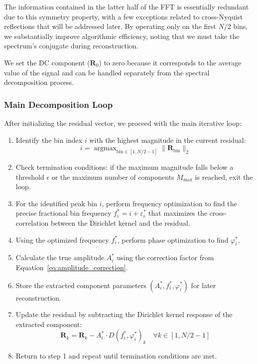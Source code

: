 \documentclass[11pt,twoside]{report}
\DeclareMathOperator*{\argmax}{argmax}
\numberwithin{thm}{section}
\numberwithin{equation}{section}
\begin{document}
The information contained in the latter half of the FFT is essentially redundant due to this symmetry property, with a few exceptions related to cross-Nyquist reflections that will be addressed later. By operating only on the first $N/2$ bins, we substantially improve algorithmic efficiency, noting that we must take the spectrum's conjugate during reconstruction.

We set the DC component ($\mathbf{R}_0$) to zero because it corresponds to the average value of the signal and can be handled separately from the spectral decomposition process.

\subsubsection{Main Decomposition Loop}

After initializing the residual vector, we proceed with the main iterative loop:

\begin{enumerate}
    \item Identify the bin index $i$ with the highest magnitude in the current residual:
    \begin{equation}
    i = \argmax_{\text{bin} \in [1, N/2-1]} \|\mathbf{R}_{\text{bin}}\|_2
    \end{equation}

    \item Check termination conditions: if the maximum magnitude falls below a threshold $\epsilon$ or the maximum number of components $M_{\max}$ is reached, exit the loop.

    \item For the identified peak bin $i$, perform frequency optimization to find the precise fractional bin frequency $f_i^* = i + \varepsilon_i^*$ that maximizes the cross-correlation between the Dirichlet kernel and the residual.

    \item Using the optimized frequency $f_i^*$, perform phase optimization to find $\varphi_i^*$.

    \item Calculate the true amplitude $A_i^*$ using the correction factor from Equation~\ref{eq:amplitude_correction}.

    \item Store the extracted component parameters $(A_i^*, f_i^*, \varphi_i^*)$ for later reconstruction.

    \item Update the residual by subtracting the Dirichlet kernel response of the extracted component:
    \begin{equation}
    \mathbf{R}_k = \mathbf{R}_k - A_i^* \cdot D(f_i^*, \varphi_i^*)_k \quad \forall k \in [1, N/2-1]
    \end{equation}

    \item Return to step 1 and repeat until termination conditions are met.
\end{enumerate}
\end{document}
